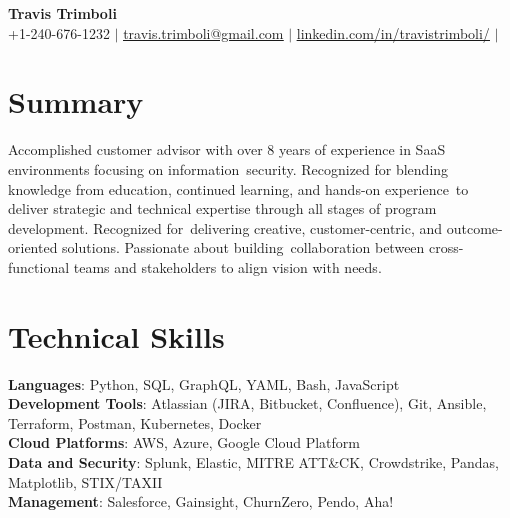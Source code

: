 \documentclass[letterpaper,11pt]{article}
\begin{document}

\begin{center}
  \textbf{\Huge \bfseries Travis Trimboli} \\ \vspace{5pt}
  \small +1-240-676-1232 $|$ \href{mailto:travis.trimboli@gmail.com}{\underline{travis.trimboli@gmail.com}} $|$
  \href{https://www.linkedin.com/in/travistrimboli/}{\underline{linkedin.com/in/travistrimboli/}} $|$
\end{center}

\section*{Summary}
Accomplished customer advisor with over 8 years of experience in SaaS environments focusing on information\
security. Recognized for blending knowledge from education, continued learning, and hands-on experience\
to deliver strategic and technical expertise through all stages of program development. Recognized for\
delivering creative, customer-centric, and outcome-oriented solutions. Passionate about building\
collaboration between cross-functional teams and stakeholders to align vision with needs.

\section{Technical Skills}
\begin{itemize}[leftmargin=0.15in, label={}]
  \small{\item{
        \textbf{Languages}{: Python, SQL, GraphQL, YAML, Bash, JavaScript} \\ \vspace{1pt}
        \textbf{Development Tools}{: Atlassian (JIRA, Bitbucket, Confluence), Git, Ansible, Terraform, Postman, Kubernetes, Docker} \\ \vspace{1pt}
        \textbf{Cloud Platforms}{: AWS, Azure, Google Cloud Platform} \\ \vspace{1pt}
        \textbf{Data and Security}{: Splunk, Elastic, {MITRE ATT\&CK}, Crowdstrike, Pandas, Matplotlib, STIX/TAXII } \\ \vspace{1pt}
        \textbf{Management}{: Salesforce, Gainsight, ChurnZero, Pendo, Aha!} 
        }}
\end{itemize}
\end{document}
